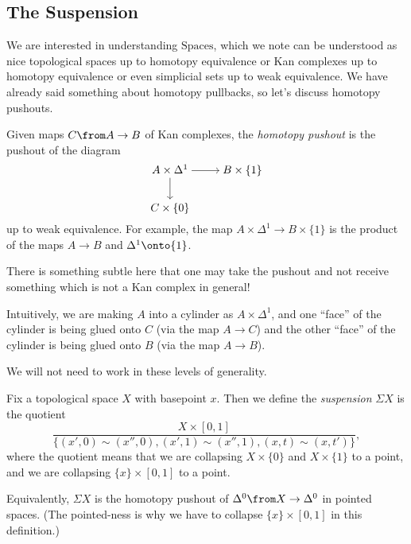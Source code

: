 \documentclass[../notes.tex]{subfiles}
\begin{document}
\subsection{The Suspension}
We are interested in understanding $\mathrm{Spaces}$, which we note can be understood as nice topological spaces up to homotopy equivalence or Kan complexes up to homotopy equivalence or even simplicial sets up to weak equivalence. We have already said something about homotopy pullbacks, so let's discuss homotopy pushouts.
\begin{definition}
	Given maps $C\from A\to B$ of Kan complexes, the \textit{homotopy push\-out} is the pushout of the diagram
	\[\begin{tikzcd}[cramped]
		{A\times\Delta^1} & {B\times\{1\}} \\
		{C\times\{0\}}
		\arrow[from=1-1, to=1-2]
		\arrow[from=1-1, to=2-1]
	\end{tikzcd}\]
	up to weak equivalence. For example, the map $A\times\Delta^1\to B\times\{1\}$ is the product of the maps $A\to B$ and $\Delta^1\onto\{1\}$.
\end{definition}
\begin{remark}
	There is something subtle here that one may take the pushout and not receive something which is not a Kan complex in general!
\end{remark}
\begin{remark}
	Intuitively, we are making $A$ into a cylinder as $A\times\Delta^1$, and one ``face'' of the cylinder is being glued onto $C$ (via the map $A\to C$) and the other ``face'' of the cylinder is being glued onto $B$ (via the map $A\to B$).
\end{remark}
We will not need to work in these levels of generality.
\begin{definition}[suspension]
	Fix a topological space $X$ with basepoint $x$. Then we define the \textit{suspension} $\Sigma X$ is the quotient
	\[\frac{X\times[0,1]}{\{(x',0)\sim(x'',0),(x',1)\sim(x'',1),(x,t)\sim(x,t')\}},\]
	where the quotient means that we are collapsing $X\times\{0\}$ and $X\times\{1\}$ to a point, and we are collapsing $\{x\}\times[0,1]$ to a point.
\end{definition}
\begin{remark}
	Equivalently, $\Sigma X$ is the homotopy pushout of $\Delta^0\from X\to\Delta^0$ in pointed spaces. (The pointed-ness is why we have to collapse $\{x\}\times[0,1]$ in this definition.)
\end{remark}
\end{document}

